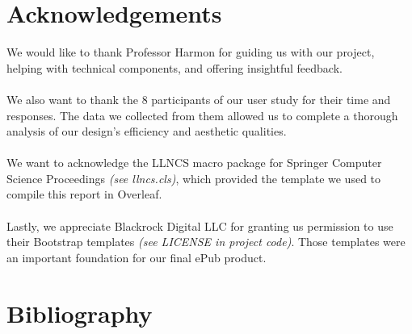 \documentclass[runningheads]{llncs}
\begin{document}
\section{Acknowledgements}
We would like to thank Professor Harmon for guiding us with our project, helping with technical components, and offering insightful feedback. \\
\\
We also want to thank the 8 participants of our user study for their time and responses. The data we collected from them allowed us to complete a thorough analysis of our design's efficiency and aesthetic qualities.\\
\\
We want to acknowledge the LLNCS macro package for Springer Computer Science Proceedings \textit{(see llncs.cls)}, which provided the template we used to compile this report in Overleaf.\\
\\
Lastly, we appreciate Blackrock Digital LLC for granting us permission to use their Bootstrap templates \textit{(see LICENSE in project code)}. Those templates were an important foundation for our final ePub product.

\section{Bibliography}
\printbibliography
%
%
\end{document}
